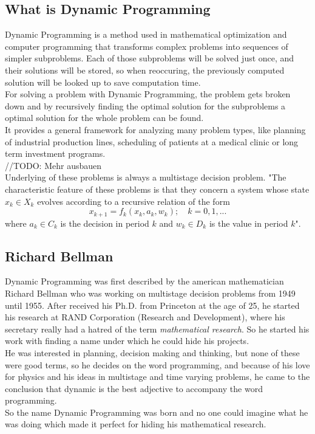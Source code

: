 \documentclass[conference]{IEEEtran}
\begin{document}
\subsection{What is Dynamic Programming}
Dynamic Programming is a method used in mathematical optimization and computer programming that transforms complex problems into sequences of simpler subproblems. Each of those subproblems will be solved just once, and their solutions will be stored, so when reoccuring, the previously computed solution will be looked up to save computation time.
\\
For solving a problem with Dynamic Programming, the problem gets broken down and by recursively finding the optimal solution for the subproblems a optimal solution for the whole problem can be found.
\\
It provides a general framework for analyzing many problem types, like planning of industrial production lines, scheduling of patients at a medical clinic or long term investment programs.
\\
//TODO: Mehr ausbauen
\\
Underlying of these problems is always a multistage decision problem. "The characteristic feature of these problems is that they concern a system whose state $x_k \in X_k$ evolves according to a recursive relation of the form
\begin{equation*}
x_{k+1} = f_k(x_k, a_k, w_k); \quad k = 0,1,...
\end{equation*}
where $a_k \in C_k$ is the decision in period $k$ and $w_k \in D_k$ is the value in period $k$"\cite{Pra.1995}.
\subsection{Richard Bellman}
Dynamic Programming was first described by the american mathematician Richard Bellman who was working on multistage decision problems from 1949 until 1955. After received his Ph.D. from Princeton at the age of 25, he started his research at RAND Corporation (Research and Development), where his secretary really had a hatred of the term \textit{mathematical research}. So he started his work with finding a name under which he could hide his projects.
\\
He was interested in planning, decision making and thinking, but none of these were good terms, so he decides on the word programming, and because of his love for physics and his ideas in multistage and time varying problems, he came to the conclusion that dynamic is the best adjective to accompany the word programming.\\
So the name Dynamic Programming was born and no one could imagine what he was doing which made it perfect for hiding his mathematical research.
\end{document}
